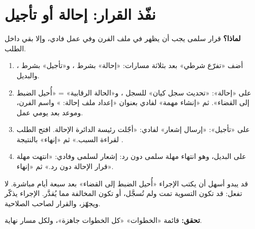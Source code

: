 \section{نفّذ القرار: إحالة أو تأجيل}
\label{sec:real-outcome}
\textbf{لماذا؟} قرار سلمى يجب أن يظهر في ملف الفرن وفي عمل فادي، وإلا بقي داخل الطلب.
\begin{enumerate}
\item أضف «تفرّع شرطي» بعد  بثلاثة مسارات: «إحالة» بشرط ، و«تأجيل» بشرط ، والبديل.
\item على «إحالة»: «تحديث سجل كيان» للسجل ، و«الحالة الرقابية» = «أُحيل الضبط إلى القضاء». ثم «إنشاء مهمة» لفادي بعنوان «إعداد ملف إحالة: » واسم الفرن، وموعد بعد يومي عمل.
\item على «تأجيل»: «إرسال إشعار» لفادي: «أجّلت رئيسة الدائرة الإحالة. افتح الطلب لقراءة السبب.» ثم «إنهاء» بالنتيجة .
\item على البديل، وهو انتهاء مهلة سلمى دون رد: إشعار لسلمى وفادي: «انتهت مهلة قرار الإحالة دون رد.» ثم «إنهاء».
\end{enumerate}
\begin{rcwarn}
قد يبدو أسهل أن يكتب الإجراء «أُحيل الضبط إلى القضاء» بعد سبعة أيام مباشرة. لا تفعل: قد تكون التسوية تمت ولم تُسجَّل، أو تكون المخالفة مما يُقدَّر. الإجراء يذكّر ويجهّز، والقرار لصاحب الصلاحية.
\end{rcwarn}
\textbf{تحقق:} قائمة «الخطوات» «كل الخطوات جاهزة»، ولكل مسار نهاية.

